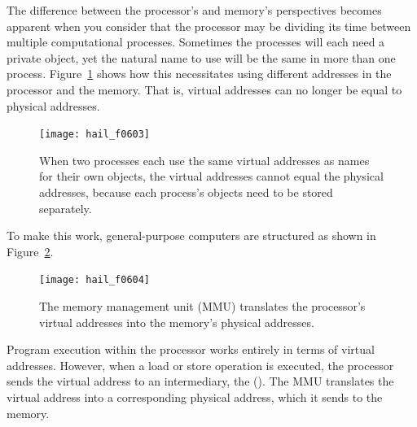 The difference between the processor's and memory's perspectives becomes apparent when you consider that
the processor may be dividing its time between multiple computational
processes.
Sometimes the processes will each need a private object,
yet the natural name to use will be the same in more than one process.
Figure~\ref{scan-6-2} shows how this necessitates using different
addresses in the processor and the memory.  That is, virtual addresses
can no longer be equal to physical addresses.
\begin{figure}
\centerline{\texttt{[image: hail\_f0603]}}
\caption{When two processes each use the same virtual
  addresses as names for their own objects, the virtual addresses
  cannot equal the physical addresses, because each process's objects
  need to be stored separately.}
\label{scan-6-2}
\end{figure}
To make this work, general-purpose computers are
structured as shown in Figure~\ref{PMM-diagram}.
\begin{figure}
\centerline{\texttt{[image: hail\_f0604]}}

\caption{The memory management unit (MMU) translates the processor's virtual
  addresses into the memory's physical addresses.}
\label{PMM-diagram}
\end{figure}
Program execution within the processor works entirely in terms of
virtual addresses.  However, when a load or store operation is
executed, the processor sends the virtual address to an intermediary,
the  ().  The MMU translates
the virtual address into a corresponding physical address, which it
sends to the memory.


